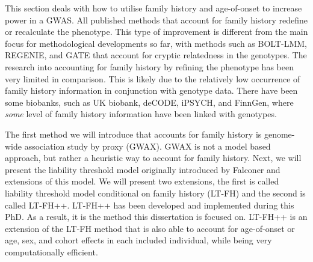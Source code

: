 
This section deals with how to utilise family history and age-of-onset to increase power in a GWAS. All published methods that account for family history redefine or recalculate the phenotype. This type of improvement is different from the main focus for methodological developments so far, with methods such as BOLT-LMM\cite{loh2015efficient}, REGENIE\cite{mbatchou2021computationally}, and GATE\cite{dey2022efficient} that account for cryptic relatedness in the genotypes. The research into accounting for family history by refining the phenotype has been very limited in comparison. This is likely due to the relatively low occurrence of family history information in conjunction with genotype data. There have been some biobanks, such as UK biobank\cite{bycroft2018uk}, deCODE\cite{noauthor_2012-jh}, iPSYCH\cite{bybjerg2020ipsych2015,pedersen2018ipsych2012}, and FinnGen\cite{Kurki2022-pt}, where \textit{some} level of family history information have been linked with genotypes. 

The first method we will introduce that accounts for family history is genome-wide association study by proxy (GWAX)\cite{gwax}. GWAX is not a model based approach, but rather a heuristic way to account for family history. Next, we will present the liability threshold model originally introduced by Falconer\cite{falconer1965inheritance} and extensions of this model. We will present two extensions, the first is called liability threshold model conditional on family history (LT-FH)\cite{hujoel2020liability} and the second is called LT-FH++. LT-FH++ has been developed and implemented during this PhD. As a result, it is the method this dissertation is focused on. LT-FH++ is an extension of the LT-FH method that is also able to account for age-of-onset or age, sex, and cohort effects in each included individual, while being very computationally efficient. 

